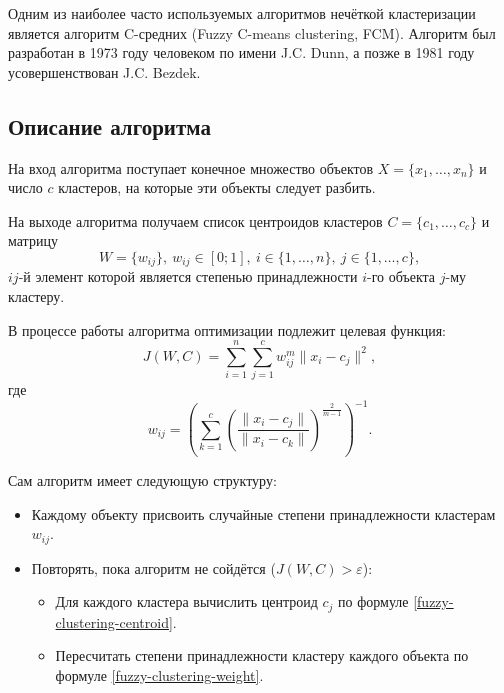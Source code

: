 Одним из наиболее часто используемых алгоритмов нечёткой кластеризации является алгоритм
C-средних (Fuzzy C-means clustering, FCM). Алгоритм был разработан в 1973 году человеком по имени
J.C. Dunn, а позже в 1981 году усовершенствован J.C. Bezdek.

\subsection{Описание алгоритма}

На вход алгоритма поступает конечное множество объектов $X = \{x_1, \ldots, x_n\}$ и число $c$
кластеров, на которые эти объекты следует разбить.

На выходе алгоритма получаем список центроидов кластеров $C = \{c_1, \ldots, c_c\}$ и матрицу
\begin{equation*}
    W = \{w_{ij}\},\ w_{ij} \in [0; 1],\ i \in \{1, \ldots, n\},\ j \in \{1, \ldots, c\},
\end{equation*}
$ij$-й элемент которой является степенью принадлежности $i$-го объекта $j$-му кластеру.

В процессе работы алгоритма оптимизации подлежит целевая функция:
\begin{equation*}
    J(W, C) = \sum\limits_{i = 1}^{n} \sum\limits_{j = 1}^{c} w_{ij}^{m} \lVert x_i - c_j \rVert^2,
\end{equation*}
где
\begin{equation}\label{fuzzy-clustering-weight}
    w_{ij} = \left(\sum\limits_{k = 1}^{c}
    \left(
    \frac{\lVert x_i - c_j \rVert}{\lVert x_i - c_k \rVert}
    \right)^{\frac{2}{m - 1}}
    \right)^{-1}.
\end{equation}

Сам алгоритм имеет следующую структуру:

\begin{itemize}
    \item Каждому объекту присвоить случайные степени принадлежности кластерам $w_{ij}$.
    \item Повторять, пока алгоритм не сойдётся ($J(W, C) > \varepsilon$):
          \begin{itemize}
              \item Для каждого кластера вычислить центроид $c_j$ по формуле
                    \eqref{fuzzy-clustering-centroid}.
              \item Пересчитать степени принадлежности кластеру каждого объекта по формуле
                    \eqref{fuzzy-clustering-weight}.
          \end{itemize}
\end{itemize}

